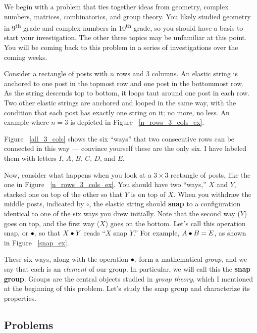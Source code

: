 \documentclass[../gatm.tex]{subfiles}
\begin{document}
We begin with a problem that ties together ideas from geometry, complex numbers, matrices, combinatorics, and group theory. You likely studied geometry in 9\textsuperscript{th} grade and complex numbers in 10\textsuperscript{th} grade, so you should have a basis to start your investigation. The other three topics may be unfamiliar at this point. You will be coming back to this problem in a series of investigations over the coming weeks.

Consider a rectangle of posts with $n$ rows and $3$ columns. An elastic string is anchored to one post in the topmost row and one post in the bottommost row. As the string descends top to bottom, it loops taut around one post in each row. Two other elastic strings are anchored and looped in the same way, with the condition that each post has exactly one string on it; no more, no less. An example where $n=3$ is depicted in Figure ~\ref{n_rows_3_cols_ex}.

Figure ~\ref{all_3_cols} shows the six ``ways'' that two consecutive rows can be connected in this way --- convince yourself these are the only six. I have labeled them with letters $I$, $A$, $B$, $C$, $D$, and $E$.

Now, consider what happens when you look at a $3\times 3$ rectangle of posts, like the one in Figure ~\ref{n_rows_3_cols_ex}. You should have two ``ways,'' $X$ and $Y$, stacked one on top of the other so that $Y$ is on top of $X$. When you withdraw the middle posts, indicated by $\circ$, the elastic string should \textbf{snap} to a configuration identical to one of the six ways you drew initially. Note that the second way ($Y$) goes on top, and the first way ($X$) goes on the bottom. Let's call this operation snap, or $\bullet$, so that $X\bullet Y$ reads ``$X$ snap $Y$.'' For example, $A\bullet B = E$, as shown in Figure ~\ref{snap_ex}.

These six ways, along with the operation $\bullet$, form a mathematical \textit{group}, and we say that each is an \textit{element} of our group. In particular, we will call this the \textbf{snap group}. Groups are the central objects studied in \textit{group theory}, which I mentioned at the beginning of this problem. Let's study the snap group and characterize its properties.

\subsection{Problems}

\end{document}
